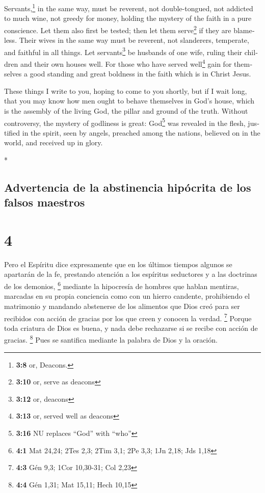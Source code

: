 \begin{paracol}{2}
\begin{otherlanguage}{english}
 Servants,\footnote{\textbf{3:8} or, Deacons.} in the same
way, must be reverent, not double-tongued, not addicted to much wine,
not greedy for money,  holding the mystery of the faith in
a pure conscience.  Let them also first be tested; then
let them serve\footnote{\textbf{3:10} or, serve as deacons} if they are
blameless.  Their wives in the same way must be reverent,
not slanderers, temperate, and faithful in all things. 
Let servants\footnote{\textbf{3:12} or, deacons} be husbands of one
wife, ruling their children and their own houses well. 
For those who have served well\footnote{\textbf{3:13} or, served well as
  deacons} gain for themselves a good standing and great boldness in the
faith which is in Christ Jesus.

 These things I write to you, hoping to come to you
shortly,  but if I wait long, that you may know how men
ought to behave themselves in God's house, which is the assembly of the
living God, the pillar and ground of the truth.  Without
controversy, the mystery of godliness is great: God\footnote{\textbf{3:16}
  NU replaces ``God'' with ``who''} was revealed in the flesh, justified
in the spirit, seen by angels, preached among the nations, believed on
in the world, and received up in glory.

\end{otherlanguage}

\switchcolumn[0]*

\hypertarget{advertencia-de-la-abstinencia-hipuxf3crita-de-los-falsos-maestros}{%
\subsection{Advertencia de la abstinencia hipócrita de los falsos
maestros}\label{advertencia-de-la-abstinencia-hipuxf3crita-de-los-falsos-maestros}}

\hypertarget{section-6}{%
\section{4}\label{section-6}}

 Pero el Espíritu dice expresamente que en los últimos
tiempos algunos se apartarán de la fe, prestando atención a los
espíritus seductores y a las doctrinas de los demonios, \footnote{\textbf{4:1}
  Mat 24,24; 2Tes 2,3; 2Tim 3,1; 2Pe 3,3; 1Jn 2,18; Jds 1,18}
 mediante la hipocresía de hombres que hablan mentiras,
marcadas en su propia conciencia como con un hierro candente,
 prohibiendo el matrimonio y mandando abstenerse de los
alimentos que Dios creó para ser recibidos con acción de gracias por los
que creen y conocen la verdad. \footnote{\textbf{4:3} Gén 9,3; 1Cor
  10,30-31; Col 2,23}  Porque toda criatura de Dios es
buena, y nada debe rechazarse si se recibe con acción de gracias.
\footnote{\textbf{4:4} Gén 1,31; Mat 15,11; Hech 10,15} 
Pues se santifica mediante la palabra de Dios y la oración.


\end{paracol}
